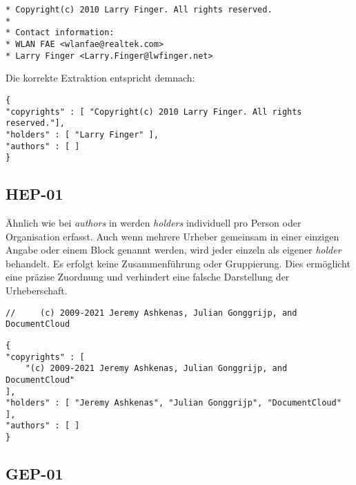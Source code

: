 \begin{lstlisting}[keepspaces=true]
* Copyright(c) 2010 Larry Finger. All rights reserved.
*
* Contact information:
* WLAN FAE <wlanfae@realtek.com>
* Larry Finger <Larry.Finger@lwfinger.net>
\end{lstlisting}

Die korrekte Extraktion entspricht demnach:

\begin{lstlisting}[keepspaces=true]
{
"copyrights" : [ "Copyright(c) 2010 Larry Finger. All rights reserved."],
"holders" : [ "Larry Finger" ],
"authors" : [ ]
}
\end{lstlisting}


\subsection{HEP-01}\label{subsec:hep-01}

Ähnlich wie bei \textit{authors} in  werden \textit{holders} individuell pro Person oder Organisation erfasst.
Auch wenn mehrere Urheber gemeinsam in einer einzigen Angabe oder einem Block genannt werden, wird jeder einzeln als eigener \textit{holder} behandelt.
Es erfolgt keine Zusammenführung oder Gruppierung.
Dies ermöglicht eine präzise Zuordnung und verhindert eine falsche Darstellung der Urheberschaft.

\begin{lstlisting}[keepspaces=true]
//     (c) 2009-2021 Jeremy Ashkenas, Julian Gonggrijp, and DocumentCloud
\end{lstlisting}

\begin{lstlisting}[keepspaces=true]
{
"copyrights" : [
    "(c) 2009-2021 Jeremy Ashkenas, Julian Gonggrijp, and DocumentCloud"
],
"holders" : [ "Jeremy Ashkenas", "Julian Gonggrijp", "DocumentCloud" ],
"authors" : [ ]
}
\end{lstlisting}


\subsection{GEP-01}\label{subsec:gep-01}

